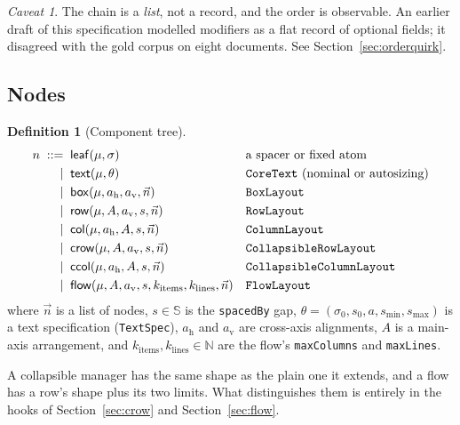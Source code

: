 \documentclass[11pt,a4paper]{article}
\newcommand{\Sc}{\mathbb{S}}
\newcommand{\leaf}{\mathsf{leaf}}
\newcommand{\ttext}{\mathsf{text}}
\newcommand{\bbox}{\mathsf{box}}
\newcommand{\rrow}{\mathsf{row}}
\newcommand{\ccol}{\mathsf{col}}
\newcommand{\crow}{\mathsf{crow}}
\newcommand{\ccolp}{\mathsf{ccol}}
\newcommand{\fflow}{\mathsf{flow}}
\newcommand{\jv}[1]{\texttt{#1}}       %
\theoremstyle{definition}
\newtheorem{definition}{Definition}[section]
\theoremstyle{plain}
\theoremstyle{remark}
\newtheorem{warning}{Caveat}[section]
\begin{document}
\begin{warning}
The chain is a \emph{list}, not a record, and the order is observable. An
earlier draft of this specification modelled modifiers as a flat record of
optional fields; it disagreed with the gold corpus on eight documents. See
Section~\ref{sec:orderquirk}.
\end{warning}

\subsection{Nodes}

\begin{definition}[Component tree]
\[
  \begin{aligned}
    n \;::=\;\;
      & \leaf(\mu, \sigma)
      && \text{a spacer or fixed atom} \\
    \mid\;\; & \ttext(\mu, \theta)
      && \text{\jv{CoreText} (nominal or autosizing)} \\
    \mid\;\; & \bbox(\mu, a_{\mathrm{h}}, a_{\mathrm{v}}, \vec{n})
      && \text{\jv{BoxLayout}} \\
    \mid\;\; & \rrow(\mu, A, a_{\mathrm{v}}, s, \vec{n})
      && \text{\jv{RowLayout}} \\
    \mid\;\; & \ccol(\mu, a_{\mathrm{h}}, A, s, \vec{n})
      && \text{\jv{ColumnLayout}} \\
    \mid\;\; & \crow(\mu, A, a_{\mathrm{v}}, s, \vec{n})
      && \text{\jv{CollapsibleRowLayout}} \\
    \mid\;\; & \ccolp(\mu, a_{\mathrm{h}}, A, s, \vec{n})
      && \text{\jv{CollapsibleColumnLayout}} \\
    \mid\;\; & \fflow(\mu, A, a_{\mathrm{v}}, s, k_{\mathrm{items}}, k_{\mathrm{lines}}, \vec{n})
      && \text{\jv{FlowLayout}}
  \end{aligned}
\]
where $\vec{n}$ is a list of nodes, $s \in \Sc$ is the \jv{spacedBy} gap,
$\theta = (\sigma_0, s_0, a, s_{\min}, s_{\max})$ is a text specification (\jv{TextSpec}),
$a_{\mathrm{h}}$ and $a_{\mathrm{v}}$ are cross-axis alignments, $A$ is a
main-axis arrangement, and $k_{\mathrm{items}}, k_{\mathrm{lines}} \in \mathbb{N}$
are the flow's \jv{maxColumns} and \jv{maxLines}.
\end{definition}

A collapsible manager has the same shape as the plain one it extends, and a flow
has a row's shape plus its two limits. What distinguishes them is entirely in the
hooks of Section~\ref{sec:crow} and Section~\ref{sec:flow}.
\end{document}
